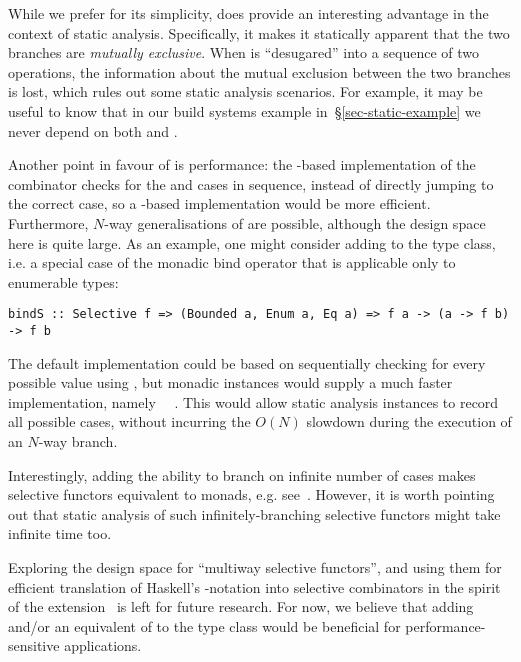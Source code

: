 \noindent
While we prefer  for its simplicity,  does provide an
interesting advantage in the context of static analysis. Specifically, it makes
it statically apparent that the two branches are \emph{mutually exclusive}. When
 is ``desugared'' into a sequence of two  operations, the
information about the mutual exclusion between the two branches is lost, which
rules out some static analysis scenarios. For example, it may be useful to know
that in our build systems example in~\S\ref{sec-static-example} we never depend
on both  and .

Another point in favour of  is performance: the -based
implementation of the  combinator checks for the  and
 cases in sequence, instead of directly jumping to the correct case,
so a -based implementation would be more efficient. Furthermore,
$N$-way generalisations of  are possible, although the design space
here is quite large. As an example, one might consider adding  to the
 type class, i.e. a special case of the monadic bind operator that
is applicable only to enumerable types:

\vspace{1mm}
\begin{verbatim}
bindS :: Selective f => (Bounded a, Enum a, Eq a) => f a -> (a -> f b) -> f b
\end{verbatim}
\vspace{1mm}

\noindent
The default implementation could be based on sequentially checking for every
possible value using , but monadic instances would supply a much
faster implementation, namely ~\hs{=}~\hs{(>>=)}. This would allow
static analysis instances to record all possible cases, without incurring
the $O(N)$ slowdown during the execution of an $N$-way branch.

Interestingly, adding the ability to branch on infinite number of cases makes
selective functors equivalent to monads, e.g. see~\citet{peebles2019sigma}.
However, it is worth pointing out that static analysis of such
infinitely-branching selective functors might take infinite time too.

Exploring the design space for ``multiway selective functors'', and using them
for efficient translation of Haskell's -notation into selective
combinators in the spirit of the 
extension~\citep{marlow2016applicativedo} is left for future research. For now,
we believe that adding  and/or an equivalent of  to the
 type class would be beneficial for performance-sensitive
applications.

